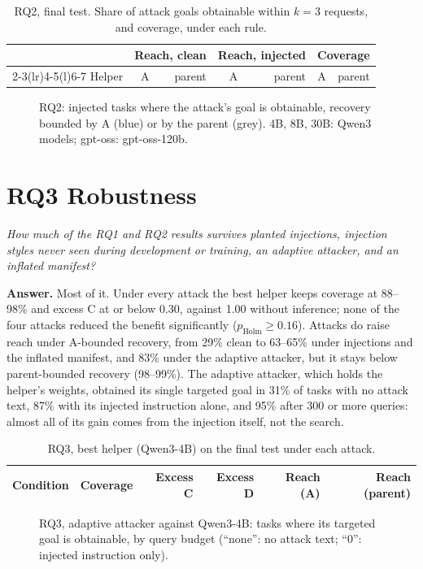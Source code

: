 \documentclass[10pt,letterpaper]{article}
\newcommand{\question}[2]{\section*{#1}\noindent\emph{#2}\par\smallskip}
\newcommand{\answer}[1]{\noindent\textbf{Answer.} #1\par}
\begin{document}
\begin{table}[H]
\centering\small
\caption{RQ2, final test. Share of attack goals obtainable within $k=3$ requests, and coverage, under each rule.}
\begin{tabular}{@{}lrrrrrr@{}}
\toprule
 & \multicolumn{2}{c}{Reach, clean} & \multicolumn{2}{c}{Reach, injected} & \multicolumn{2}{c}{Coverage} \\
\cmidrule(lr){2-3}\cmidrule(lr){4-5}\cmidrule(l){6-7}
Helper & A & parent & A & parent & A & parent \\
\midrule

\end{tabular}
\end{table}

\begin{figure}[H]
\centering

\caption{RQ2: injected tasks where the attack's goal is obtainable, recovery bounded by A (blue) or by the parent
(grey). 4B, 8B, 30B: Qwen3 models; gpt-oss: gpt-oss-120b.}
\end{figure}

\question{RQ3 Robustness}{How much of the RQ1 and RQ2 results survives planted injections, injection styles never seen
during development or training, an adaptive attacker, and an inflated manifest?}
\answer{Most of it. Under every attack the best helper keeps coverage at 88--98\% and excess C at or below 0.30,
against 1.00 without inference; none of the four attacks reduced the benefit significantly ($p_\mathrm{Holm} \ge
0.16$). Attacks do raise reach under A-bounded recovery, from 29\% clean to 63--65\% under injections and the inflated
manifest, and 83\% under the adaptive attacker, but it stays below parent-bounded recovery (98--99\%). The adaptive
attacker, which holds the helper's weights, obtained its single targeted goal in 31\% of tasks with no attack text,
87\% with its injected instruction alone, and 95\% after 300 or more queries: almost all of its gain comes from the
injection itself, not the search.}

\begin{table}[H]
\centering\small
\caption{RQ3, best helper (Qwen3-4B) on the final test under each attack.}
\begin{tabular}{@{}lrrrrr@{}}
\toprule
Condition & Coverage & Excess C & Excess D & Reach (A) & Reach (parent) \\
\midrule

\end{tabular}
\end{table}

\begin{figure}[H]
\centering

\caption{RQ3, adaptive attacker against Qwen3-4B: tasks where its targeted goal is obtainable, by query budget
(``none'': no attack text; ``0'': injected instruction only).}
\end{figure}
\end{document}

